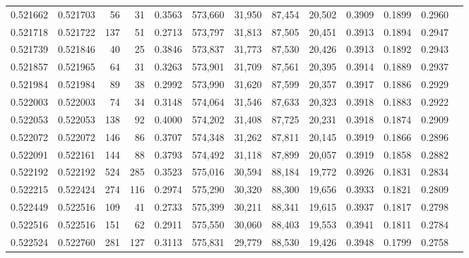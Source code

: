 \begin{tabular}{rrrrrrrrrrrrr}
0.521662 & 0.521703 &    56 &    31 &                                     0.3563 & 573,660 &  31,950 &  87,454 &  20,502 & 0.3909 & 0.1899 & 0.2960 \\
0.521718 & 0.521722 &   137 &    51 &                                     0.2713 & 573,797 &  31,813 &  87,505 &  20,451 & 0.3913 & 0.1894 & 0.2947 \\
0.521739 & 0.521846 &    40 &    25 &                                     0.3846 & 573,837 &  31,773 &  87,530 &  20,426 & 0.3913 & 0.1892 & 0.2943 \\
0.521857 & 0.521965 &    64 &    31 &                                     0.3263 & 573,901 &  31,709 &  87,561 &  20,395 & 0.3914 & 0.1889 & 0.2937 \\
0.521984 & 0.521984 &    89 &    38 &                                     0.2992 & 573,990 &  31,620 &  87,599 &  20,357 & 0.3917 & 0.1886 & 0.2929 \\
0.522003 & 0.522003 &    74 &    34 &                                     0.3148 & 574,064 &  31,546 &  87,633 &  20,323 & 0.3918 & 0.1883 & 0.2922 \\
0.522053 & 0.522053 &   138 &    92 &                                     0.4000 & 574,202 &  31,408 &  87,725 &  20,231 & 0.3918 & 0.1874 & 0.2909 \\
0.522072 & 0.522072 &   146 &    86 &                                     0.3707 & 574,348 &  31,262 &  87,811 &  20,145 & 0.3919 & 0.1866 & 0.2896 \\
0.522091 & 0.522161 &   144 &    88 &                                     0.3793 & 574,492 &  31,118 &  87,899 &  20,057 & 0.3919 & 0.1858 & 0.2882 \\
0.522192 & 0.522192 &   524 &   285 &                                     0.3523 & 575,016 &  30,594 &  88,184 &  19,772 & 0.3926 & 0.1831 & 0.2834 \\
0.522215 & 0.522424 &   274 &   116 &                                     0.2974 & 575,290 &  30,320 &  88,300 &  19,656 & 0.3933 & 0.1821 & 0.2809 \\
0.522449 & 0.522516 &   109 &    41 &                                     0.2733 & 575,399 &  30,211 &  88,341 &  19,615 & 0.3937 & 0.1817 & 0.2798 \\
0.522516 & 0.522516 &   151 &    62 &                                     0.2911 & 575,550 &  30,060 &  88,403 &  19,553 & 0.3941 & 0.1811 & 0.2784 \\
0.522524 & 0.522760 &   281 &   127 &                                     0.3113 & 575,831 &  29,779 &  88,530 &  19,426 & 0.3948 & 0.1799 & 0.2758 \\

\end{tabular}
